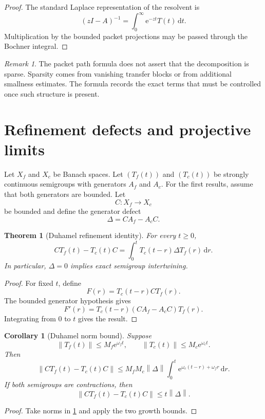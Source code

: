 \documentclass{aomart}
\newtheorem{theorem}{Theorem}[section]
\newtheorem{corollary}[corollary]{Corollary}
\theoremstyle{definition}
\theoremstyle{remark}
\newtheorem{remark}[remark]{Remark}
\newcommand{\e}{\mathrm e}
\newcommand{\dd}{\,\mathrm d}
\newcommand{\norm}[1]{\left\lVert#1\right\rVert}
\begin{document}
\begin{proof}
The standard Laplace representation of the resolvent is
\[
(zI-A)^{-1}
=
\int_0^{\infty}\e^{-zt}T(t)\dd t.
\]
Multiplication by the bounded packet projections may be passed through the Bochner integral.
\end{proof}

\begin{remark}
The packet path formula does not assert that the decomposition is sparse. Sparsity comes from vanishing transfer blocks or from additional smallness estimates. The formula records the exact terms that must be controlled once such structure is present.
\end{remark}

\section{Refinement defects and projective limits}\label{sec:refinement}

Let \(X_f\) and \(X_c\) be Banach spaces. Let \((T_f(t))\) and \((T_c(t))\) be strongly continuous semigroups with generators \(A_f\) and \(A_c\). For the first results, assume that both generators are bounded. Let
\[
C:X_f\longrightarrow X_c
\]
be bounded and define the generator defect
\[
\Delta=CA_f-A_cC.
\]

\begin{theorem}[Duhamel refinement identity]\label{thm:duhamel_refinement}
For every \(t\geq0\),
\[
\boxed{
CT_f(t)-T_c(t)C
=
\int_0^tT_c(t-r)\Delta T_f(r)\dd r.
}
\]
In particular, \(\Delta=0\) implies exact semigroup intertwining.
\end{theorem}

\begin{proof}
For fixed \(t\), define
\[
F(r)=T_c(t-r)CT_f(r).
\]
The bounded generator hypothesis gives
\[
F'(r)=T_c(t-r)(CA_f-A_cC)T_f(r).
\]
Integrating from \(0\) to \(t\) gives the result.
\end{proof}

\begin{corollary}[Duhamel norm bound]\label{cor:duhamel_bound}
Suppose
\[
\norm{T_f(t)}\leq M_f\e^{\omega_f t},
\qquad
\norm{T_c(t)}\leq M_c\e^{\omega_c t}.
\]
Then
\[
\norm{CT_f(t)-T_c(t)C}
\leq
M_fM_c\norm\Delta
\int_0^t\e^{\omega_c(t-r)+\omega_f r}\dd r.
\]
If both semigroups are contractions, then
\[
\norm{CT_f(t)-T_c(t)C}
\leq t\norm\Delta.
\]
\end{corollary}

\begin{proof}
Take norms in \cref{thm:duhamel_refinement} and apply the two growth bounds.
\end{proof}
\end{document}
